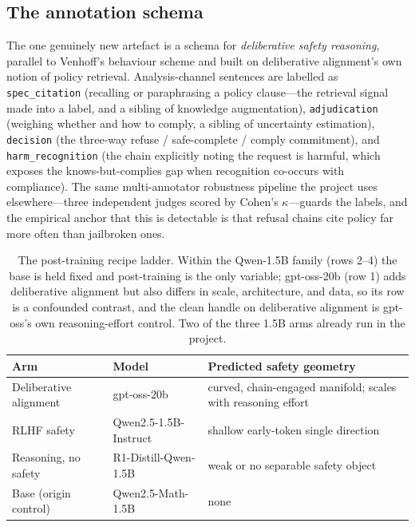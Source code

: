 \documentclass[10pt]{article}
\begin{document}
\subsection{The annotation schema}

The one genuinely new artefact is a schema for \emph{deliberative safety reasoning},
parallel to Venhoff's behaviour scheme and built on deliberative alignment's own
notion of policy retrieval. Analysis-channel sentences are labelled as
\texttt{spec\_citation} (recalling or paraphrasing a policy clause---the retrieval
signal made into a label, and a sibling of knowledge augmentation),
\texttt{adjudication} (weighing whether and how to comply, a sibling of uncertainty
estimation), \texttt{decision} (the three-way refuse / safe-complete / comply
commitment), and \texttt{harm\_recognition} (the chain explicitly noting the request
is harmful, which exposes the knows-but-complies gap when recognition co-occurs with
compliance). The same multi-annotator robustness pipeline the project uses
elsewhere---three independent judges scored by Cohen's $\kappa$---guards the labels,
and the empirical anchor that this is detectable is that refusal chains cite policy
far more often than jailbroken ones.

\begin{table}[t]
\centering
\small
\caption{The post-training recipe ladder. Within the Qwen-1.5B family (rows
2--4) the base is held fixed and post-training is the only variable; gpt-oss-20b
(row 1) adds deliberative alignment but also differs in scale, architecture, and
data, so its row is a confounded contrast, and the clean handle on deliberative
alignment is gpt-oss's own reasoning-effort control. Two of the three 1.5B arms
already run in the project.}
\label{tab:ladder}
\begin{tabularx}{\textwidth}{@{}l l Y@{}}
\toprule
\textbf{Arm} & \textbf{Model} & \textbf{Predicted safety geometry} \\
\midrule
Deliberative alignment & gpt-oss-20b & curved, chain-engaged manifold; scales with reasoning effort \\
RLHF safety & Qwen2.5-1.5B-Instruct & shallow early-token single direction \\
Reasoning, no safety & R1-Distill-Qwen-1.5B & weak or no separable safety object \\
Base (origin control) & Qwen2.5-Math-1.5B & none \\
\bottomrule
\end{tabularx}
\end{table}
\end{document}
